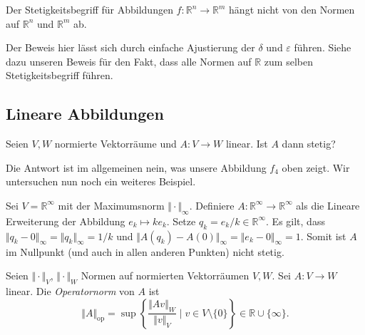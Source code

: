 \documentclass[../main.tex]{subfiles}
\begin{document}
\begin{corollary}\label{cor:continuity-independent}
  Der Stetigkeitsbegriff für Abbildungen
  $f \colon \mathbb{R}^n \to \mathbb{R}^m$ 
  hängt nicht von den Normen auf $\mathbb{R}^n$ 
  und $\mathbb{R}^m$ ab.
\end{corollary}

Der Beweis hier lässt sich durch einfache Ajustierung
der $\delta$ und $\varepsilon$ führen.
Siehe dazu unseren Beweis für den Fakt,
dass alle Normen auf $\mathbb{R}$ zum
selben Stetigkeitsbegriff führen.

\subsection*{Lineare Abbildungen}
\begin{question}
Seien $V, W$ normierte Vektorräume und
$A \colon V \to W$ linear.
Ist $A$ dann stetig?
\end{question}

Die Antwort ist im allgemeinen nein, was unsere
Abbildung $f_4$ oben zeigt. Wir untersuchen
nun noch ein weiteres Beispiel.

\begin{example}
  Sei $V = \mathbb{R}^{\infty}$ mit der
  Maximumsnorm $\Vert \cdot \Vert_{\infty}$.
  Definiere $A \colon \mathbb{R}^{\infty} \to \mathbb{R}^{\infty}$ 
  als die Lineare Erweiterung der Abbildung $e_k \mapsto ke_k$.
  Setze  $q_k = e_k/k \in \mathbb{R}^{\infty}$.
  Es gilt, dass
  \(
    \Vert q_k - 0 \Vert_{\infty} = \Vert q_k \Vert_{\infty} = 1/k
  \)
  und $\Vert A(q_k) - A(0) \Vert_{\infty} = \Vert e_k - 0 \Vert_{\infty}
  = 1$. Somit ist $A$ im Nullpunkt (und auch in allen anderen Punkten)
  nicht stetig.
\end{example}

\begin{definition}
  Seien $\Vert \cdot \Vert_V$, $\Vert \cdot \Vert_W$ 
  Normen auf normierten Vektorräumen $V, W$.
  Sei $A \colon V \to W$ linear.
  Die \emph{Operatornorm} von $A$ ist
  \[
    \Vert A \Vert_{\text{op}} = \sup
    \left\{\frac{\Vert Av \Vert_W}{\Vert v \Vert_V} \mid v \in
    V \setminus \{0\}\right\} \in \mathbb{R} \cup \{\infty\}.
  \]
\end{definition}
\end{document}
